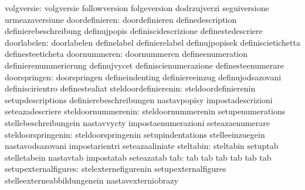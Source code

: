                       volgversie: volgversie                       followversion
                                  folgeversion                     dodrzujverzi
                                  seguiversione                    urmeazaversiune
                  doordefinieren: doordefinieren                   definedescription
                                  definierebeschreibung            definujpopis
                                  definiscidescrizione             definestedescriere
                     doorlabelen: doorlabelen                      definelabel
                                  definierelabel                   definujpopisek
                                  definiscietichetta               definesteeticheta
                    doornummeren: doornummeren                     defineenumeration
                                  definierenummerierung            definujvycet
                                  definiscienumerazione            definesteenumerare
                    doorspringen: doorspringen                     defineindenting
                                  definiereeinzug                  definujodsazovani
                                  definiscirientro                 definestealiat
            steldoordefinierenin: steldoordefinierenin             setupdescriptions
                                  definierebeschreibungen          nastavpopisy
                                  impostadescrizioni               seteazadescriere
              steldoornummerenin: steldoornummerenin               setupenumerations
                                  stellebeschreibungein            nastavvycty
                                  impostaenumerazioni              seteazaenumerare
              steldoorspringenin: steldoorspringenin               setupindentations
                                  stelleeinzuegein                 nastavodsazovani
                                  impostarientri                   seteazaaliniate
                       steltabin: steltabin                        setuptab
                                  stelletabein                     nastavtab
                                  impostatab                       seteazatab
                             tab: tab                              tab
                                  tab                              tab
                                  tab                              tab
            setupexternalfigures: stelexternefigurenin             setupexternalfigures
                                  stelleexterneabbildungenein      nastavexterniobrazy
